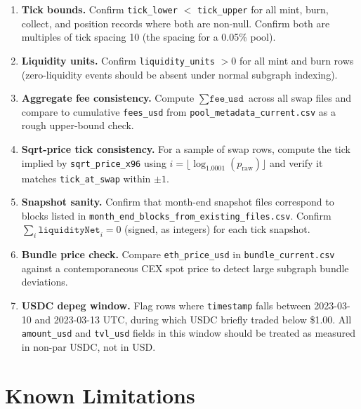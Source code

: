 \documentclass[11pt,a4paper]{article}
\begin{document}
\begin{enumerate}
  \item \textbf{Tick bounds.} Confirm \texttt{tick\_lower} $<$
        \texttt{tick\_upper} for all mint, burn, collect, and position
        records where both are non-null. Confirm both are multiples of
        tick spacing 10 (the spacing for a 0.05\% pool).

  \item \textbf{Liquidity units.} Confirm \texttt{liquidity\_units} $> 0$
        for all mint and burn rows (zero-liquidity events should be absent
        under normal subgraph indexing).

  \item \textbf{Aggregate fee consistency.} Compute
        $\sum \texttt{fee\_usd}$ across all swap files and compare to
        cumulative \texttt{fees\_usd} from \texttt{pool\_metadata\_current.csv}
        as a rough upper-bound check.

  \item \textbf{Sqrt-price tick consistency.} For a sample of swap rows,
        compute the tick implied by \texttt{sqrt\_price\_x96} using
        $i = \lfloor \log_{1.0001}(p_{\mathrm{raw}}) \rfloor$ and
        verify it matches \texttt{tick\_at\_swap} within $\pm 1$.

  \item \textbf{Snapshot sanity.} Confirm that month-end snapshot files
        correspond to blocks listed in
        \texttt{month\_end\_blocks\_from\_existing\_files.csv}. Confirm
        $\sum_i \texttt{liquidityNet}_i = 0$ (signed, as integers) for each
        tick snapshot.

  \item \textbf{Bundle price check.} Compare \texttt{eth\_price\_usd}
        in \texttt{bundle\_current.csv} against a contemporaneous CEX
        spot price to detect large subgraph bundle deviations.

  \item \textbf{USDC depeg window.} Flag rows where
        \texttt{timestamp} falls between 2023-03-10 and 2023-03-13 UTC,
        during which USDC briefly traded below \$1.00. All
        \texttt{amount\_usd} and \texttt{tvl\_usd} fields in this window
        should be treated as measured in non-par USDC, not in USD.
\end{enumerate}

\section{Known Limitations}
\label{sec:limits}
\end{document}
